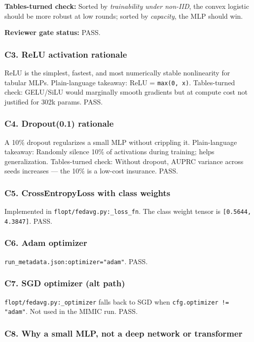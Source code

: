 \documentclass{article}
\begin{document}
\textbf{Tables-turned check:} Sorted by \emph{trainability under non-IID}, the convex logistic should be more robust at low rounds; sorted by \emph{capacity}, the MLP should win.


\textbf{Reviewer gate status:} PASS.


\subsubsection{C3. ReLU activation rationale}


ReLU is the simplest, fastest, and most numerically stable nonlinearity for tabular MLPs. Plain-language takeaway: ReLU = \texttt{max(0, x)}. Tables-turned check: GELU/SiLU would marginally smooth gradients but at compute cost not justified for 302k params. PASS.


\subsubsection{C4. Dropout(0.1) rationale}


A 10\% dropout regularizes a small MLP without crippling it. Plain-language takeaway: Randomly silence 10\% of activations during training; helps generalization. Tables-turned check: Without dropout, AUPRC variance across seeds increases --- the 10\% is a low-cost insurance. PASS.


\subsubsection{C5. CrossEntropyLoss with class weights}


Implemented in \texttt{flopt/fedavg.py:\_loss\_fn}. The class weight tensor is \texttt{[0.5644, 4.3847]}. PASS.


\subsubsection{C6. Adam optimizer}


\texttt{run\_metadata.json:optimizer="adam"}. PASS.


\subsubsection{C7. SGD optimizer (alt path)}


\texttt{flopt/fedavg.py:\_optimizer} falls back to SGD when \texttt{cfg.optimizer != "adam"}. Not used in the MIMIC run. PASS.


\subsubsection{C8. Why a small MLP, not a deep network or transformer}
\end{document}
